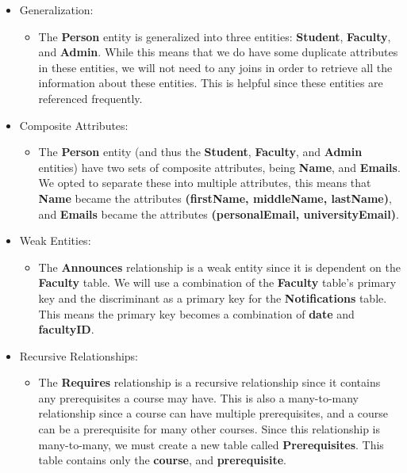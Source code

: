 \documentclass{report}
\begin{document}
\begin{itemize}

    \item Generalization:
    \begin{itemize}
        \item The \textbf{Person} entity is generalized into three entities: \textbf{Student}, \textbf{Faculty}, and \textbf{Admin}. While this means that we do have some duplicate attributes in these entities, we will not need to any joins in order to retrieve all the information about these entities. This is helpful since these entities are referenced frequently.
    \end{itemize}

    \item Composite Attributes:
    \begin{itemize}
        \item The \textbf{Person} entity (and thus the \textbf{Student}, \textbf{Faculty}, and \textbf{Admin} entities) have two sets of composite attributes, being \textbf{Name}, and \textbf{Emails}. We opted to separate these into multiple attributes, this means that \textbf{Name} became the attributes \textbf{(firstName, middleName, lastName)}, and \textbf{Emails} became the attributes \textbf{(personalEmail, universityEmail)}.
    \end{itemize}

    \item Weak Entities:
    \begin{itemize}
        \item The \textbf{Announces} relationship is a weak entity since it is dependent on the \textbf{Faculty} table. We will use a combination of the \textbf{Faculty} table's primary key and the discriminant as a primary key for the \textbf{Notifications} table. This means the primary key becomes a combination of \textbf{date} and \textbf{facultyID}.
    \end{itemize}

    \item Recursive Relationships:
    \begin{itemize}
        \item The \textbf{Requires} relationship is a recursive relationship since it contains any prerequisites a course may have. This is also a many-to-many relationship since a course can have multiple prerequisites, and a course can be a prerequisite for many other courses. Since this relationship is many-to-many, we must create a new table called \textbf{Prerequisites}. This table contains only the \textbf{course}, and \textbf{prerequisite}.
    \end{itemize}


\end{itemize}
\end{document}
